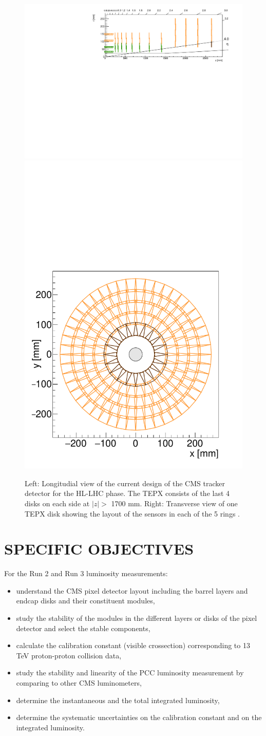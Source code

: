 \documentclass[final,12p]{article}
\begin{document}
\begin{figure}[H]
  \centering
  \includegraphics[width=0.7\columnwidth]{./TEPX_rz.pdf}
  \includegraphics[width=0.27\columnwidth]{./TEPX_rphi.pdf}
  \caption{
    Left: Longitudial view of the current design of the CMS tracker detector for the HL-LHC phase. The TEPX consists of the last 4 disks on each side at $|z|>$ 1700 mm.
    Right: Transverse view of one TEPX disk showing the layout of the sensors in each of the 5 rings \cite{Klein:2017nke}.
  }
  \label{fig:tepx}
\end{figure}



\section{SPECIFIC OBJECTIVES}

For the Run 2 and Run 3 luminosity measurements:
\begin{itemize}
\item understand the CMS pixel detector layout including the barrel layers and endcap disks and their constituent modules,
\item study the stability of the modules in the different layers or disks of the pixel detector and select the stable components,
\item calculate the calibration constant (visible crossection) corresponding to 13 TeV proton-proton collision data,
\item study the stability and linearity of the PCC luminosity measurement by comparing to other CMS luminometers,
\item determine the instantaneous and the total integrated luminosity,
\item determine the systematic uncertainties on the calibration constant and on the integrated luminosity.
\end{itemize}
\end{document}
